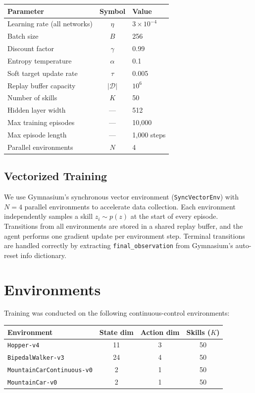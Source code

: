 \documentclass[11pt,a4paper]{article}
\begin{document}
\begin{table}[h]
\centering\small
\begin{tabular}{@{}lcl@{}}
\toprule
\textbf{Parameter} & \textbf{Symbol} & \textbf{Value} \\
\midrule
Learning rate (all networks) & $\eta$ & $3 \times 10^{-4}$ \\
Batch size & $B$ & 256 \\
Discount factor & $\gamma$ & 0.99 \\
Entropy temperature & $\alpha$ & 0.1 \\
Soft target update rate & $\tau$ & 0.005 \\
Replay buffer capacity & $|\mathcal{D}|$ & $10^6$ \\
Number of skills & $K$ & 50 \\
Hidden layer width & --- & 512 \\
Max training episodes & --- & 10,000 \\
Max episode length & --- & 1,000 steps \\
Parallel environments & $N$ & 4 \\
\bottomrule
\end{tabular}
\end{table}

\subsection{Vectorized Training}

We use Gymnasium's synchronous vector environment (\texttt{SyncVectorEnv}) with $N{=}4$ parallel environments to accelerate data collection. Each environment independently samples a skill $z_i \sim p(z)$ at the start of every episode. Transitions from all environments are stored in a shared replay buffer, and the agent performs one gradient update per environment step. Terminal transitions are handled correctly by extracting \texttt{final\_observation} from Gymnasium's auto-reset info dictionary.

\section{Environments}

Training was conducted on the following continuous-control environments:

\begin{table}[h]
\centering\small
\begin{tabular}{@{}lccc@{}}
\toprule
\textbf{Environment} & \textbf{State dim} & \textbf{Action dim} & \textbf{Skills ($K$)} \\
\midrule
\texttt{Hopper-v4} & 11 & 3 & 50 \\
\texttt{BipedalWalker-v3} & 24 & 4 & 50 \\
\texttt{MountainCarContinuous-v0} & 2 & 1 & 50 \\
\texttt{MountainCar-v0} & 2 & 1 & 50 \\
\bottomrule
\end{tabular}
\end{table}
\end{document}
